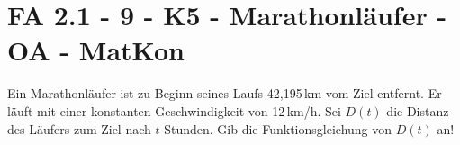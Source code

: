 \section{FA 2.1 - 9 - K5 - Marathonläufer - OA - MatKon}

\begin{beispiel}[FA 2.1]{1}
Ein Marathonläufer ist zu Beginn seines Laufs 42,195\,km vom Ziel entfernt. Er läuft mit einer konstanten Geschwindigkeit von 12\,km/h. Sei $D(t)$ die Distanz des Läufers zum Ziel nach $t$ Stunden. Gib die Funktionsgleichung von $D(t)$ an!

\end{beispiel}